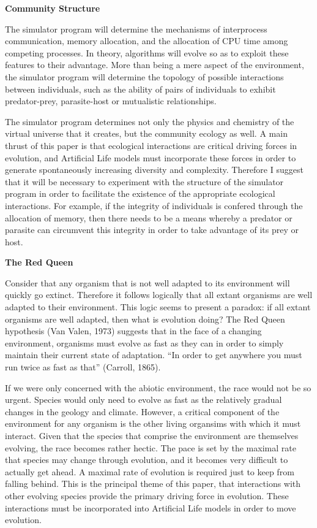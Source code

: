 \LP
\bf Community Structure\rm
\eLP

The simulator program will determine the mechanisms of interprocess
communication, memory allocation, and the allocation of CPU time among
competing processes.  In theory, algorithms will evolve so as to exploit
these features to their advantage.  More than being a mere aspect of the
environment, the simulator program will determine the topology of
possible interactions between individuals, such as the ability of
pairs of individuals to exhibit predator-prey, parasite-host or 
mutualistic relationships.

The simulator program determines not only the physics and chemistry of
the virtual universe that it creates, but the community ecology as well.
A main thrust of this paper is that ecological interactions are
critical driving forces in evolution, and Artificial Life models must
incorporate these forces in order to generate spontaneously increasing
diversity and complexity.  Therefore I suggest that it will be necessary
to experiment with the structure of the simulator program in order to
facilitate the existence of the appropriate ecological interactions.
For example, if the integrity of individuals is confered through the
allocation of memory, then there needs to be a means whereby a predator
or parasite can circumvent this integrity in order to take advantage of
its prey or host.

\LP
\bf The Red Queen\rm
\eLP

Consider that any organism that is not well adapted to its environment
will quickly go extinct.  Therefore it follows logically that all
extant organisms are well adapted to their environment.  This logic
seems to present a paradox: if all extant organisms are well adapted,
then what is evolution doing?  The Red Queen hypothesis (Van Valen, 1973)
suggests that in the face of a changing environment, organisms must evolve
as fast as they can in order to simply maintain their current state of
adaptation.  ``In order to get anywhere you must run twice as fast as
that'' (Carroll, 1865).

If we were only concerned with the abiotic environment, the race would
not be so urgent.  Species would only need to evolve as fast as the relatively
gradual changes in the geology and climate.  However, a critical component
of the environment for any organism is the other living organsims with which
it must interact.  Given that the species that comprise the environment
are themselves evolving, the race becomes rather hectic.  The pace is set
by the maximal rate that species may change through evolution, and it
becomes very difficult to actually get ahead.  A maximal rate of evolution
is required just to keep from falling behind.  This is the principal theme
of this paper, that interactions with other evolving species provide the
primary driving force in evolution.  These interactions must be incorporated
into Artificial Life models in order to move evolution.

